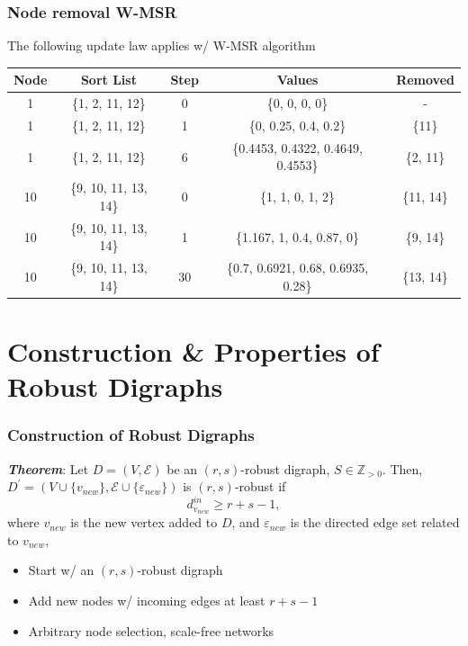 \documentclass{beamer}
\begin{document}
\begin{frame}
\frametitle{Node removal W-MSR}
The following update law applies w/ W-MSR algorithm
\begin{table}
\centering
\begin{tabular}{|c|c|c|c|c|}
\hline \scriptsize{\textbf{Node}} &\scriptsize{\textbf{Sort List}} & \scriptsize{\textbf{Step}}&  \scriptsize{\textbf{Values}}  & \scriptsize{\textbf{Removed}} \\
\hline \scriptsize{1} &\scriptsize{\{1, 2, 11, 12\} } & \scriptsize{0}& \scriptsize{\{0, 0, 0, 0\}}   & \scriptsize{-} \\
\hline \scriptsize{1} &\scriptsize{\{1, 2, 11, 12\} } & \scriptsize{1}& \scriptsize{\{0, 0.25, 0.4, 0.2\}}   & \scriptsize{\{11\} } \\
\hline \scriptsize{1} &\scriptsize{\{1, 2, 11, 12\}} & \scriptsize{6}& \scriptsize{\{0.4453, 0.4322, 0.4649, 0.4553\}}   & \scriptsize{\{2, 11\}} \\	
\hline \scriptsize{10} &\scriptsize{\{9, 10, 11, 13, 14\} } & \scriptsize{0}& \scriptsize{\{1, 1, 0, 1, 2\}}   & \scriptsize{\{11, 14\}} \\
\hline \scriptsize{10} &\scriptsize{\{9, 10, 11, 13, 14\} } & \scriptsize{1}& \scriptsize{\{1.167, 1, 0.4, 0.87, 0\}}   & \scriptsize{\{9, 14\}} \\
\hline \scriptsize{10} &\scriptsize{\{9, 10, 11, 13, 14\} } & \scriptsize{30} & \scriptsize{\{0.7, 0.6921, 0.68, 0.6935, 0.28\}}  & \scriptsize{\{13, 14\}} \\	
\hline
\end{tabular}
\end{table}

\end{frame}

\section{Construction \& Properties of Robust Digraphs}

\begin{frame}
\frametitle{Construction of Robust Digraphs}
\textbf{\textit{Theorem}}: Let $D=(V, \mathcal{E} )$ be an $(r,s)$-robust digraph, $S\in \mathbb{Z}_{>0}$. Then, $D^{\prime}=(V\cup \{v_{new}\},\mathcal{E} \cup \{\varepsilon_{new} \})$ is $(r,s)$-robust if
\begin{equation*}
d_{v_{new}}^{in}\geq r+s-1,
\end{equation*}
where $v_{new}$ is the new vertex added to $D$, and $\varepsilon_{new}$ is the directed edge set related to $v_{new}$, 
\begin{itemize}
\item Start w/ an $(r,s)$-robust digraph 
\item Add new nodes w/ incoming edges at least $r+s-1$
\item Arbitrary node selection, scale-free networks
\end{itemize}

\end{frame}
\end{document}

